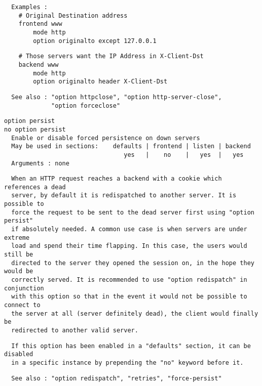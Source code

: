 \begin{verbatim}
  Examples :
    # Original Destination address
    frontend www
        mode http
        option originalto except 127.0.0.1
\end{verbatim}

\begin{verbatim}
    # Those servers want the IP Address in X-Client-Dst
    backend www
        mode http
        option originalto header X-Client-Dst
\end{verbatim}

\begin{verbatim}
  See also : "option httpclose", "option http-server-close",
             "option forceclose"
\end{verbatim}

\begin{verbatim}
option persist
no option persist
  Enable or disable forced persistence on down servers
  May be used in sections:    defaults | frontend | listen | backend
                                 yes   |    no    |   yes  |   yes
  Arguments : none
\end{verbatim}

\begin{verbatim}
  When an HTTP request reaches a backend with a cookie which references a dead
  server, by default it is redispatched to another server. It is possible to
  force the request to be sent to the dead server first using "option persist"
  if absolutely needed. A common use case is when servers are under extreme
  load and spend their time flapping. In this case, the users would still be
  directed to the server they opened the session on, in the hope they would be
  correctly served. It is recommended to use "option redispatch" in conjunction
  with this option so that in the event it would not be possible to connect to
  the server at all (server definitely dead), the client would finally be
  redirected to another valid server.
\end{verbatim}

\begin{verbatim}
  If this option has been enabled in a "defaults" section, it can be disabled
  in a specific instance by prepending the "no" keyword before it.
\end{verbatim}

\begin{verbatim}
  See also : "option redispatch", "retries", "force-persist"
\end{verbatim}

